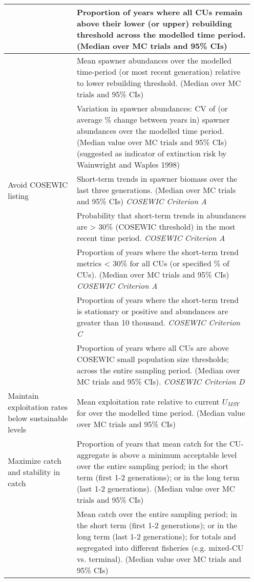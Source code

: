 \documentclass[12pt]{article}\usepackage[]{graphicx}\usepackage[]{color}
\begin{document}
\begin{longtable}[t]{>{\raggedright\arraybackslash}p{15em}>{\raggedright\arraybackslash}p{30em}}
\cmidrule(l){2-2}  & Proportion of years where all CUs remain above their lower (or upper) rebuilding threshold across the modelled time period. (Median over MC trials and 95\% CIs)\\
\cmidrule(l){2-2}  & Mean spawner abundances over the modelled time-period (or most recent generation) relative to lower rebuilding threshold. (Median over MC trials and 95\% CIs)\\
\cmidrule(l){2-2}  & Variation in spawner abundances: CV of (or average \% change between years in) spawner abundances over the modelled time period. (Median value over MC trials and 95\% CIs) (suggested as indicator of extinction risk by Wainwright and Waples 1998)\\
\midrule Avoid COSEWIC listing & Short-term trends in spawner biomass over the last three generations. (Median over MC trials and 95\% CIs) \emph{COSEWIC Criterion A}\\
\cmidrule(l){2-2}  & Probability that short-term trends in abundances are > 30\% (COSEWIC threshold) in the most recent time period. \emph{COSEWIC Criterion A}\\
\cmidrule(l){2-2}  & Proportion of years where the short-term trend metrics < 30\% for all CUs (or specified \% of CUs). (Median over MC trials and 95\% CIs) \emph{COSEWIC Criterion A}\\
\cmidrule(l){2-2}  & Proportion of years where the short-term trend is stationary or positive and abundances are greater than 10 thousand. \emph{COSEWIC Criterion C}\\
\cmidrule(l){2-2}  & Proportion of years where all CUs are above COSEWIC small population size thresholds; across the entire sampling period. (Median over MC trials and 95\% CIs). \emph{COSEWIC Criterion D}\\
\midrule Maintain exploitation rates below sustainable levels & Mean exploitation rate relative to current $U_{MSY}$ for over the modelled time period. (Median value over MC trials and 95\% CIs)\\
\midrule Maximize catch and stability in catch & Proportion of years that mean catch for the CU-aggregate is above a minimum acceptable level over the entire sampling period; in the short term (first 1-2 generations); or in the long term (last 1-2 generations). (Median value over MC trials and 95\% CIs)\\
\cmidrule(l){2-2}  & Mean catch over the entire sampling period; in the short term (first 1-2 generations); or in the long term (last 1-2 generations); for totals and segregated into different fisheries (e.g. mixed-CU vs. terminal). (Median value over MC trials and 95\% CIs)\\

\end{longtable}
\end{document}
